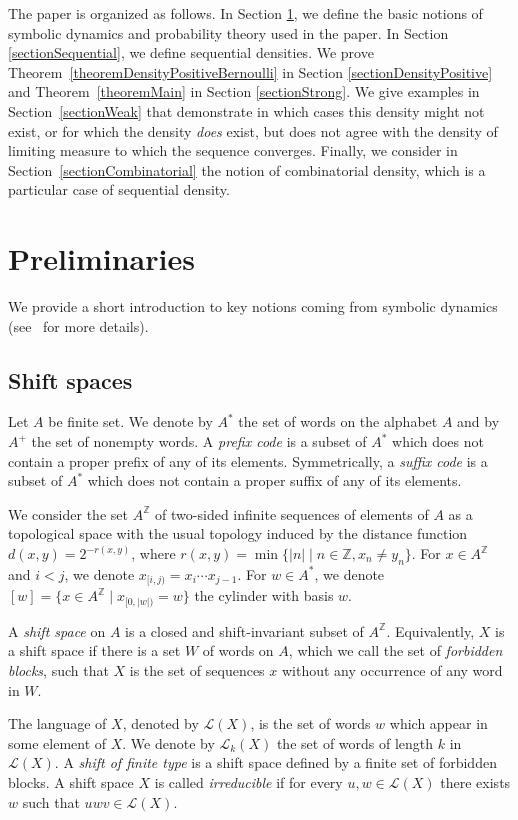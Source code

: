 \documentclass{article}[11pt]
\newcommand\cL{\mathcal{L}}
\newcommand{\Z}{\mathbb{Z}}
\numberwithin{theorem}{section}
\numberwithin{equation}{section}
\numberwithin{figure}{section}
\numberwithin{table}{section}
\begin{document}
The paper is organized as follows. In Section \ref{sectionPreliminaries},
we define the basic notions of symbolic dynamics and probability theory used in the paper.
In Section \ref{sectionSequential}, we define sequential densities.
We prove Theorem~\ref{theoremDensityPositiveBernoulli} in Section \ref{sectionDensityPositive}
and Theorem~\ref{theoremMain} in 
Section \ref{sectionStrong}. 
We give examples in Section~\ref{sectionWeak}
that demonstrate in which cases this density might not exist, or for which the density \emph{does} exist, but does not agree with the density of limiting measure to which the sequence converges. 
Finally, we consider in Section~\ref{sectionCombinatorial}
the notion of combinatorial density, which is a particular case of sequential density.

\section{Preliminaries}\label{sectionPreliminaries}

We provide a short introduction to key notions coming from symbolic dynamics
(see~\cite{LindMarcus1995} for more details).
\subsection{Shift spaces}
Let $A$ be finite set. We denote by $A^*$ the set of words on the alphabet $A$
and by $A^+$ the set of nonempty words.
A \emph{prefix code} is a subset  of $A^*$ which does
not contain a proper prefix of any of its elements.
Symmetrically, a \emph{suffix code} is a subset  of $A^*$ which does
not contain a proper suffix of any of its elements.


We consider the set $A^\Z$ of two-sided infinite sequences of elements of
$A$ as a topological space with the usual topology induced by the distance function
$d(x,y)=2^{-r(x,y)}$, where $r(x,y)=\min\{|n|\mid n\in\Z, x_n\ne y_n\}$.
For $x\in A^\Z$ and $i<j$, we denote $x_{[i,j)}	=x_i\cdots x_{j-1}$.
For $w\in A^*$, we denote $[w]=\{x\in A^\Z\mid x_{[0,|w|)}=w\}$
the cylinder with basis $w$.

A \emph{shift space} on $A$ is a closed and shift-invariant subset of $A^\Z$.
 Equivalently, $X$
is a shift space if there is a set $W$ of words on $A$, which we
call the set of \emph{forbidden blocks},
such that $X$ is the set of sequences $x$ without any occurrence of any word in $W$.

The language of $X$, denoted by $\cL(X)$, is the set of words $w$ 
which appear in some element of $X$. 
We denote by $\cL_k(X)$ the set of words of length $k$ in $\cL(X)$.
A \emph{shift of finite type} is a shift space defined by a finite set of forbidden blocks.
A shift space $X$  is called \emph{irreducible} if for every $u,w\in\cL(X)$
there exists $w$ such that $uwv\in\cL(X)$.
\end{document}
